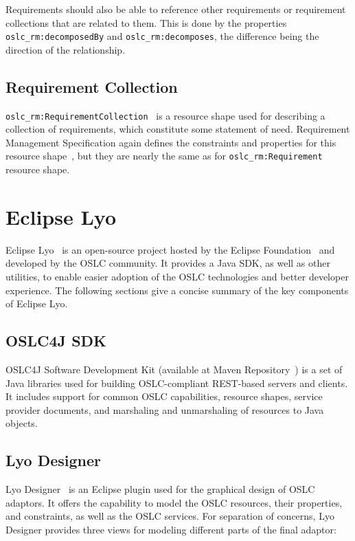Requirements should also be able to reference other requirements or requirement collections that are related to them. This is done by the properties \texttt{oslc\_rm:decomposedBy} and \texttt{oslc\_rm:decomposes}, the difference being the direction of the relationship.

\subsection*{Requirement Collection}
\texttt{oslc\_rm:RequirementCollection} \cite{oslc_rm_requirement_collection} is a resource shape used for describing a collection of requirements, which constitute some statement of need. Requirement Management Specification again defines the constraints and properties for this resource shape \cite{oslc_rm_requirement_collection_constraints}, but they are nearly the same as for \texttt{oslc\_rm:Requirement} resource shape.

\section{Eclipse Lyo}
Eclipse Lyo \cite{eclipse_lyo} is an open-source project hosted by the Eclipse Foundation \cite{eclipse} and developed by the OSLC community. It provides a Java SDK, as well as other utilities, to enable easier adoption of the OSLC technologies and better developer experience. The following sections give a concise summary of the key components of Eclipse Lyo.

\subsection*{OSLC4J SDK}
OSLC4J Software Development Kit (available at Maven Repository \cite{maven_oslc4j}) is a set of Java libraries used for building OSLC-compliant REST-based servers and clients. It includes support for common OSLC capabilities, resource shapes, service provider documents, and marshaling and unmarshaling of resources to Java objects. 

\subsection*{Lyo Designer}
Lyo Designer \cite{lyo_designer} is an Eclipse plugin used for the graphical design of OSLC adaptors. It offers the capability to model the OSLC resources, their properties, and constraints, as well as the OSLC services. For separation of concerns, Lyo Designer provides three views for modeling different parts of the final adaptor:

